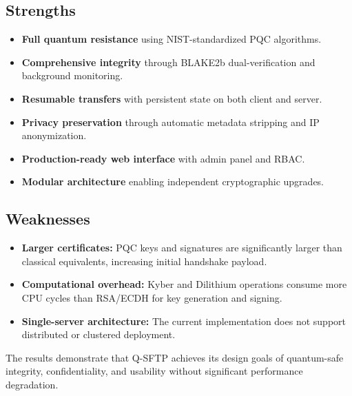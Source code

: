\subsection{Strengths}
\begin{itemize}
    \item \textbf{Full quantum resistance} using NIST-standardized PQC algorithms.
    \item \textbf{Comprehensive integrity} through BLAKE2b dual-verification and background monitoring.
    \item \textbf{Resumable transfers} with persistent state on both client and server.
    \item \textbf{Privacy preservation} through automatic metadata stripping and IP anonymization.
    \item \textbf{Production-ready web interface} with admin panel and RBAC.
    \item \textbf{Modular architecture} enabling independent cryptographic upgrades.
\end{itemize}

\subsection{Weaknesses}
\begin{itemize}
    \item \textbf{Larger certificates:} PQC keys and signatures are significantly larger than classical equivalents, increasing initial handshake payload.
    \item \textbf{Computational overhead:} Kyber and Dilithium operations consume more CPU cycles than RSA/ECDH for key generation and signing.
    \item \textbf{Single-server architecture:} The current implementation does not support distributed or clustered deployment.
\end{itemize}

The results demonstrate that Q-SFTP achieves its design goals of quantum-safe integrity, confidentiality, and usability without significant performance degradation.
